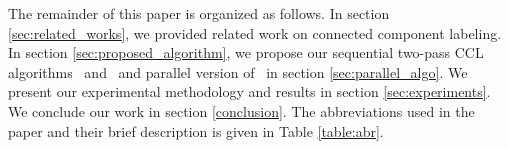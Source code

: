 The remainder of this paper is organized as follows. In section
\ref{sec:related_works}, we provided related work on connected component labeling.
In section \ref{sec:proposed_algorithm}, we propose our sequential two-pass CCL
algorithms \nremsp\ and \aremsp\ and parallel version of \aremsp\ in section
\ref{sec:parallel_algo}.
We present our experimental methodology and results in section
\ref{sec:experiments}. We conclude our work in section
\ref{conclusion}. The abbreviations used in the paper and their brief
description is given in Table \ref{table:abr}.


